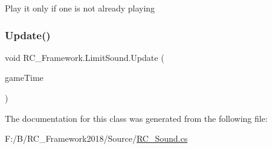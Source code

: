 Play it only if one is not already playing 

\mbox{\label{class_r_c___framework_1_1_limit_sound_a9d6eda93ccf422244fbe7a9ca2a19f13}} 
\subsubsection{\texorpdfstring{Update()}{Update()}}
{\footnotesize\ttfamily void R\+C\+\_\+\+Framework.\+Limit\+Sound.\+Update (\begin{DoxyParamCaption}\item[{Game\+Time}]{game\+Time }\end{DoxyParamCaption})}



The documentation for this class was generated from the following file\+:\begin{DoxyCompactItemize}
\item 
F\+:/\+B/\+R\+C\+\_\+\+Framework2018/\+Source/\mbox{\hyperlink{_r_c___sound_8cs}{R\+C\+\_\+\+Sound.\+cs}}\end{DoxyCompactItemize}
